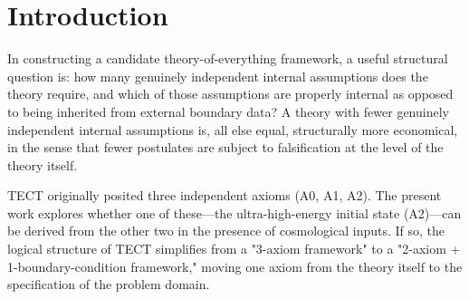 \begin{abstract}
We analyse the logical role of axiom A2 (an ultra-high-energy
isotropic initial state at $t = -\infty$) in the foundations of
topological energy condensate theory and show that A2 admits a
\emph{weakening / reclassification}, NOT an elimination. Given a
Brazovskii free-energy functional A0, dissipative TDGL kinetics A1,
and an externally supplied cosmological cooling history $T(t)$ with
an early-time regime $T \gg T_c$, the original axiom A2 need not be
imposed as an independent microscopic dynamical law. It can be
replaced by the weaker requirement that the early-time state belongs
to the symmetric high-temperature phase \emph{class}, characterised
at the coarse-grained level by $\langle \Psi \rangle = 0$ and full
unbroken spatial / internal symmetry. Two structural caveats prevent
a stronger ``elimination'' claim: (a) the dissipative TDGL flow is
NOT time-reversible, so a unique microscopic backward extrapolation
to $t = -\infty$ cannot be invoked; (b) the ensemble-level
phase-class statement $\langle \Psi \rangle = 0$ does not single out a
unique microscopic Cauchy datum. The total number of premises is
preserved (3 = 2 internal axioms + 1 external boundary input); the
reclassification moves $T(t)$ from an internal TECT axiom to an
external cosmological input rather than eliminating it.
\end{abstract}

\maketitle

\section{Introduction}
In constructing a candidate theory-of-everything framework, a useful
structural question is: how many genuinely independent internal
assumptions does the theory require, and which of those assumptions
are properly internal as opposed to being inherited from external
boundary data? A theory with fewer genuinely independent internal
assumptions is, all else equal, structurally more economical, in the
sense that fewer postulates are subject to falsification at the level
of the theory itself.

TECT originally posited three independent axioms (A0, A1, A2). The
present work explores whether one of these—the ultra-high-energy initial
state (A2)—can be derived from the other two in the presence of
cosmological inputs. If so, the logical structure of TECT simplifies
from a "3-axiom framework" to a "2-axiom + 1-boundary-condition
framework," moving one axiom from the theory itself to the specification
of the problem domain.

